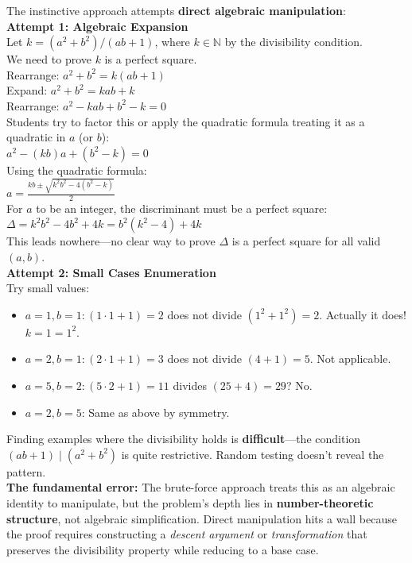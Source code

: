 \documentclass{article}
\begin{document}
The instinctive approach attempts \textbf{direct algebraic manipulation}: \\

\noindent \textbf{Attempt 1: Algebraic Expansion} \\
Let $k = (a^2 + b^2)/(ab + 1)$, where $k \in \mathbb{N}$ by the divisibility condition. \\
We need to prove $k$ is a perfect square. \\
Rearrange: $a^2 + b^2 = k(ab + 1)$ \\
Expand: $a^2 + b^2 = kab + k$ \\
Rearrange: $a^2 - kab + b^2 - k = 0$ \\
Students try to factor this or apply the quadratic formula treating it as a quadratic in $a$ (or $b$): \\
$a^2 - (kb)a + (b^2 - k) = 0$ \\
Using the quadratic formula: \\
$a = \frac{kb \pm \sqrt{k^2b^2 - 4(b^2 - k)}}{2}$ \\
For $a$ to be an integer, the discriminant must be a perfect square: \\
$\Delta = k^2b^2 - 4b^2 + 4k = b^2(k^2 - 4) + 4k$ \\
This leads nowhere—no clear way to prove $\Delta$ is a perfect square for all valid $(a,b)$. \\

\noindent \textbf{Attempt 2: Small Cases Enumeration} \\
Try small values:
\begin{itemize}
    \item $a = 1, b = 1: (1 \cdot 1 + 1) = 2$ does not divide $(1^2 + 1^2) = 2$. Actually it does! $k = 1 = 1^2$. \checkmark
    \item $a = 2, b = 1: (2 \cdot 1 + 1) = 3$ does not divide $(4 + 1) = 5$. Not applicable.
    \item $a = 5, b = 2: (5 \cdot 2 + 1) = 11$ divides $(25 + 4) = 29$? No.
    \item $a = 2, b = 5$: Same as above by symmetry.
\end{itemize}
Finding examples where the divisibility holds is \textbf{difficult}—the condition $(ab + 1) \mid (a^2 + b^2)$ is quite restrictive. Random testing doesn't reveal the pattern. \\

\noindent \textbf{The fundamental error:} The brute-force approach treats this as an algebraic identity to manipulate, but the problem's depth lies in \textbf{number-theoretic structure}, not algebraic simplification. Direct manipulation hits a wall because the proof requires constructing a \textit{descent argument} or \textit{transformation} that preserves the divisibility property while reducing to a base case.
\end{document}
